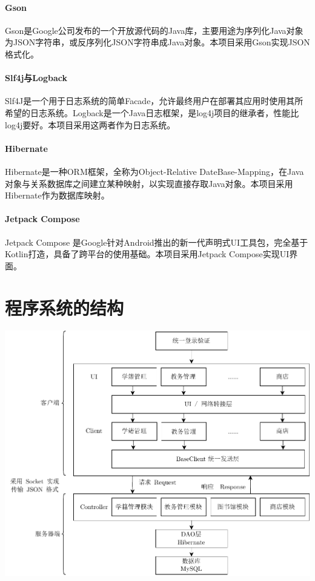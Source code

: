 \documentclass{article}
\begin{document}
\paragraph{Gson}
Gson是Google公司发布的一个开放源代码的Java库，主要用途为序列化Java对象为JSON字符串，或反序列化JSON字符串成Java对象。本项目采用Gson实现JSON格式化。

\paragraph{Slf4j与Logback}
Slf4J是一个用于日志系统的简单Facade，允许最终用户在部署其应用时使用其所希望的日志系统。Logback是一个Java日志框架，是log4j项目的继承者，性能比log4j要好。本项目采用这两者作为日志系统。

\paragraph{Hibernate}
Hibernate是一种ORM框架，全称为Object-Relative DateBase-Mapping，在Java对象与关系数据库之间建立某种映射，以实现直接存取Java对象。本项目采用Hibernate作为数据库映射。

\paragraph{Jetpack Compose}
Jetpack Compose 是Google针对Android推出的新一代声明式UI工具包，完全基于Kotlin打造，具备了跨平台的使用基础。本项目采用Jetpack Compose实现UI界面。

\section{程序系统的结构}

\begin{center}
\includegraphics[width=\textwidth]{fig/full-flowchart.pdf}
\end{center}
\end{document}
